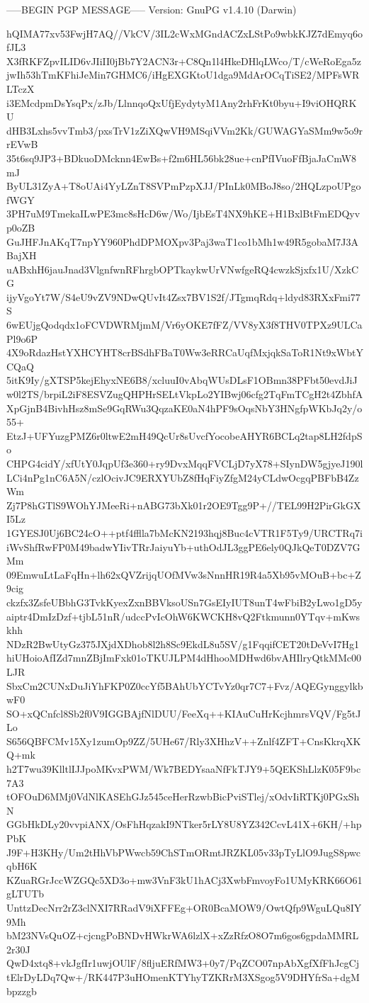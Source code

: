 -----BEGIN PGP MESSAGE-----
Version: GnuPG v1.4.10 (Darwin)

hQIMA77xv53FwjH7AQ//VkCV/3IL2cWxMGndACZxLStPo9wbkKJZ7dEmyq6ofJL3
X3fRKFZpvILID6vJIiII0jBb7Y2ACN3r+C8Qn1l4HkeDHlqLWco/T/cWeRoEga5z
jwIh53hTmKFhiJeMin7GHMC6/iHgEXGKtoU1dga9MdArOCqTiSE2/MPFsWRLTczX
i3EMcdpmDsYsqPx/zJb/LlnnqoQxUfjEydytyM1Any2rhFrKt0byu+I9viOHQRKU
dHB3Lxhs5vvTmb3/pxsTrV1zZiXQwVH9MSqiVVm2Kk/GUWAGYaSMm9w5o9rrEVwB
35t6sq9JP3+BDkuoDMcknn4EwBs+f2m6HL56bk28ue+cnPfIVuoFfBjaJaCmW8mJ
ByUL31ZyA+T8oUAi4YyLZnT8SVPmPzpXJJ/PInLk0MBoJ8so/2HQLzpoUPgofWGY
3PH7uM9TmekaILwPE3mc8sHcD6w/Wo/IjbEsT4NX9hKE+H1BxlBtFmEDQyvp0oZB
GuJHFJnAKqT7npYY960PhdDPMOXpv3Paj3waT1co1bMh1w49R5gobaM7J3ABajXH
uABxhH6jauJnad3VlgnfwnRFhrgbOPTkaykwUrVNwfgeRQ4cwzkSjxfx1U/XzkCG
ijyVgoYt7W/S4eU9vZV9NDwQUvIt4Zsx7BV1S2f/JTgmqRdq+ldyd83RXxFmi77S
6wEUjgQodqdx1oFCVDWRMjmM/Vr6yOKE7fFZ/VV8yX3f8THV0TPXz9ULCaPl9o6P
4X9oRdazHstYXHCYHT8crBSdhFBaT0Ww3eRRCaUqfMxjqkSaToR1Nt9xWbtYCQaQ
5itK9Iy/gXTSP5kejEhyxNE6B8/xcluuI0vAbqWUsDLsF1OBmn38PFbt50evdJiJ
w0l2TS/brpiL2iF8ESVZugQHPHrSELtVkpLo2YIBwj06cfg2TqFmTCgH2t4ZbhfA
XpGjnB4BivhHsz8mSe9GqRWu3QqzaKE0aN4hPF9sOqsNbY3HNgfpWKbJq2y/o55+
EtzJ+UFYuzgPMZ6r0ltwE2mH49QcUr8sUvcfYocobeAHYR6BCLq2tap8LH2fdpSo
CHPG4cidY/xfUtY0JqpUf3e360+ry9DvxMqqFVCLjD7yX78+SIynDW5gjyeJ190l
LCi4nPg1nC6A5N/czlOcivJC9ERXYUbZ8fHqFiyZfgM24yCLdwOcgqPBFbB4ZzWm
Zj7P8hGTlS9WOhYJMeeRi+nABG73bXk01r2OE9Tgg9P+//TEL99H2PirGkGXI5Lz
1GYESJ0Uj6BC24cO++ptf4fflla7bMcKN2193hqj8Buc4cVTR1F5Ty9/URCTRq7i
iWvShfRwFP0M49badwYIivTRrJaiyuYb+uthOdJL3ggPE6ely0QJkQeT0DZV7GMm
09EmwuLtLaFqHn+lh62xQVZrijqUOfMVw3sNnnHR19R4a5Xb95vMOuB+bc+Z9cig
ckzfx3ZsfeUBbhG3TvkKyexZxnBBVksoUSn7GsEIyIUT8unT4wFbiB2yLwo1gD5y
aiptr4DmIzDzf+tjbL51nR/udccPvIcOhW6KWCKH8vQ2Ftkmunn0YTqv+mKwskhh
NDzR2BwUtyGz375JXjdXDhob8l2h8Sc9EkdL8u5SV/g1FqqifCET20tDeVvI7Hg1
hiUHoioAfIZd7mnZBjImFxk01oTKUJLPM4dHhooMDHwd6bvAHIlryQtkMMc00LJR
SbxCm2CUNxDuJiYhFKP0Z0ccYf5BAhUbYCTvYz0qr7C7+Fvz/AQEGynggylkbwF0
SO+xQCnfcl8Sb2f0V9IGGBAjfNlDUU/FeeXq++KIAuCuHrKcjhmrsVQV/Fg5tJLo
S656QBFCMv15Xy1zumOp9ZZ/5UHe67/Rly3XHhzV++Znlf4ZFT+CnsKkrqXKQ+mk
h2T7wu39KlltlIJJpoMKvxPWM/Wk7BEDYsaaNfFkTJY9+5QEKShLlzK05F9bc7A3
tOFOuD6MMj0VdNlKASEhGJz545ceHerRzwbBicPviSTlej/xOdvIiRTKj0PGxShN
GGbHkDLy20vvpiANX/OsFhHqzakI9NTker5rLY8U8YZ342CcvL41X+6KH/+hpPbK
J9F+H3KHy/Um2tHhVbPWwcb59ChSTmORmtJRZKL05v33pTyLlO9JugS8pwcqbH6K
KZuaRGrJccWZGQc5XD3o+mw3VnF3kU1hACj3XwbFmvoyFo1UMyKRK66O61gLTUTb
UnttzDecNrr2rZ3clNXI7RRadV9iXFFEg+OR0BcaMOW9/OwtQfp9WguLQu8IY9Mh
bM23NVsQuOZ+cjcngPoBNDvHWkrWA6lzlX+xZzRfzO8O7m6gos6gpdaMMRL2r30J
QwD4xtq8+vkJgfIr1uwjOUlF/8fljuERfMW3+0y7/PqZCO07npAbXgfXfFhJcgCj
tElrDyLDq7Qw+/RK447P3uHOmenKTYhyTZKRrM3XSgog5V9DHYfrSa+dgMbpzzgb

